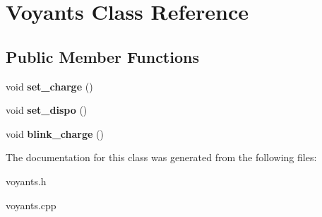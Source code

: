 \hypertarget{classVoyants}{}\section{Voyants Class Reference}
\label{classVoyants}
\subsection*{Public Member Functions}
\begin{DoxyCompactItemize}
\item 
\mbox{\label{classVoyants_a4bb4496af5a52b8e71b24f7196306563}} 
void {\bfseries set\+\_\+charge} ()
\item 
\mbox{\label{classVoyants_a4f70cd793d038b760276ffa766097967}} 
void {\bfseries set\+\_\+dispo} ()
\item 
\mbox{\label{classVoyants_aa70caee71aa462737aa0cb5b03860a33}} 
void {\bfseries blink\+\_\+charge} ()
\end{DoxyCompactItemize}


The documentation for this class was generated from the following files\+:\begin{DoxyCompactItemize}
\item 
voyants.\+h\item 
voyants.\+cpp\end{DoxyCompactItemize}
